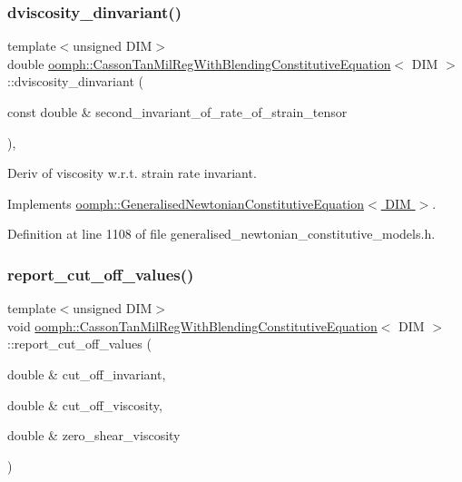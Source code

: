 \subsubsection{\texorpdfstring{dviscosity\+\_\+dinvariant()}{dviscosity\_dinvariant()}}
{\footnotesize\ttfamily template$<$unsigned D\+IM$>$ \\
double \hyperlink{classoomph_1_1CassonTanMilRegWithBlendingConstitutiveEquation}{oomph\+::\+Casson\+Tan\+Mil\+Reg\+With\+Blending\+Constitutive\+Equation}$<$ D\+IM $>$\+::dviscosity\+\_\+dinvariant (\begin{DoxyParamCaption}\item[{const double \&}]{second\+\_\+invariant\+\_\+of\+\_\+rate\+\_\+of\+\_\+strain\+\_\+tensor }\end{DoxyParamCaption})\hspace{0.3cm}{\ttfamily [inline]}, {\ttfamily [virtual]}}



Deriv of viscosity w.\+r.\+t. strain rate invariant. 



Implements \hyperlink{classoomph_1_1GeneralisedNewtonianConstitutiveEquation_ad0164e6ca57cc986048346e12c4d353a}{oomph\+::\+Generalised\+Newtonian\+Constitutive\+Equation$<$ D\+I\+M $>$}.



Definition at line 1108 of file generalised\+\_\+newtonian\+\_\+constitutive\+\_\+models.\+h.

\mbox{\label{classoomph_1_1CassonTanMilRegWithBlendingConstitutiveEquation_a85c8fceda5fda7218847f277c3a2920e}} 
\subsubsection{\texorpdfstring{report\+\_\+cut\+\_\+off\+\_\+values()}{report\_cut\_off\_values()}}
{\footnotesize\ttfamily template$<$unsigned D\+IM$>$ \\
void \hyperlink{classoomph_1_1CassonTanMilRegWithBlendingConstitutiveEquation}{oomph\+::\+Casson\+Tan\+Mil\+Reg\+With\+Blending\+Constitutive\+Equation}$<$ D\+IM $>$\+::report\+\_\+cut\+\_\+off\+\_\+values (\begin{DoxyParamCaption}\item[{double \&}]{cut\+\_\+off\+\_\+invariant,  }\item[{double \&}]{cut\+\_\+off\+\_\+viscosity,  }\item[{double \&}]{zero\+\_\+shear\+\_\+viscosity }\end{DoxyParamCaption})\hspace{0.3cm}{\ttfamily [inline]}}



